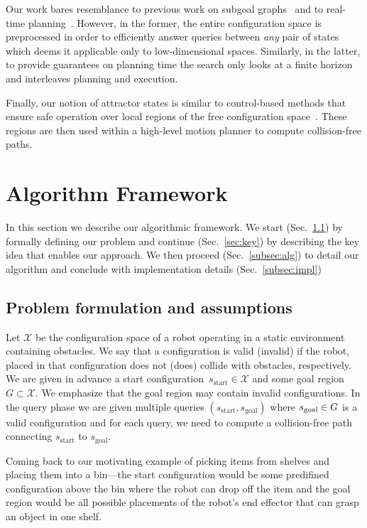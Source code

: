 \documentclass[letterpaper]{article} %
\newcommand{\calX}{\ensuremath{\mathcal{X}}\xspace}
\newcommand{\sStart}{\ensuremath{s_{\text{start}}\xspace}}
\begin{document}
Our work bares resemblance to previous work on 
subgoal graphs~\cite{UK17,UK18} and to real-time planning~\cite{KL06,KS09,K90}.
However, in the former, the entire configuration space is preprocessed in order to efficiently answer queries between \emph{any} pair of states which deems it applicable only to low-dimensional spaces.
Similarly, in the latter, to provide guarantees on planning time the search only looks at a finite horizon and interleaves planning and execution.

Finally, our notion of attractor states is similar to control-based methods that  ensure safe operation over local regions of the free configuration space~\cite{CRC03,CCR06}.
These regions are then used within a high-level motion planner to compute collision-free paths.

\section{Algorithm Framework}
\label{sec:alg}
In this section we describe our algorithmic framework. We start (Sec.~\ref{sec:pdef}) by formally defining our problem and continue (Sec.~\ref{sec:key}) by describing the key idea that enables our approach.
We then proceed (Sec.~\ref{subsec:alg}) to detail our algorithm and conclude with implementation details (Sec.~\ref{subsec:impl})

\subsection{Problem formulation and assumptions}
\label{sec:pdef}
Let $\calX$ be the configuration space of a robot operating in a static environment containing obstacles.
We say that a configuration is valid (invalid) if the robot, placed in that configuration does not (does) collide with obstacles, respectively.
We are given in advance a start configuration~$\sStart \in \calX$ and some goal region~$G \subset \calX$.
We emphasize that the goal region may contain invalid configurations.
In the query phase we are given multiple queries $(\sStart, s_{\text{goal}})$ where $s_{\rm goal} \in G$ is a valid configuration and for each query, we need to compute a collision-free path connecting $\sStart$ to $s_{\text{goal}}$.

Coming back to our motivating example of picking items from  shelves and placing them into a bin---the start configuration would be some predifined configuration above the bin where the robot can drop off the item and the goal region would be all possible placements of the robot's end effector that can grasp an object in one shelf.
\end{document}
